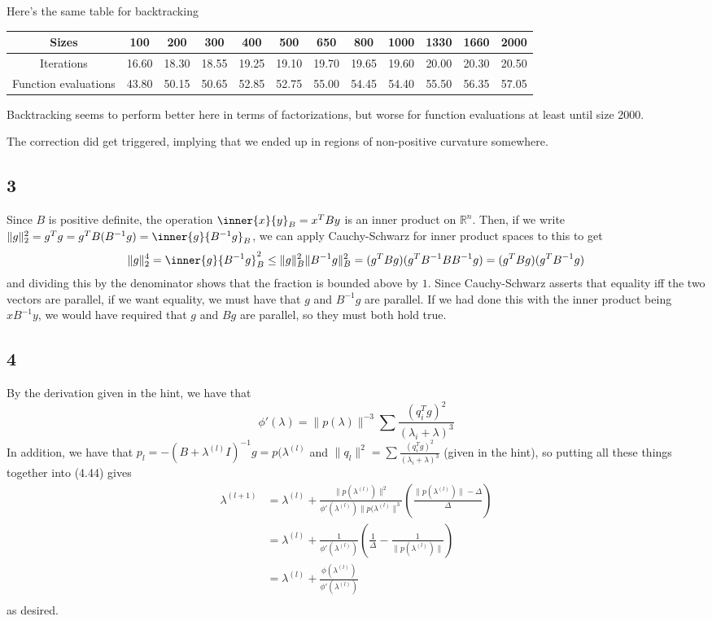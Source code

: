 \documentclass{article}
\newcommand{\rn}{\mathbb{R}}
\begin{document}
Here's the same table for backtracking

\begin{tabular}{c|ccccccccccc}
    Sizes&100&200&300&400&500&650&800&1000&1330&1660&2000\\
    \hline
    Iterations&16.60&18.30&18.55&19.25&19.10&19.70&19.65&19.60&20.00&20.30&20.50\\
    Function evaluations&43.80&50.15&50.65&52.85&52.75&55.00&54.45&54.40&55.50&56.35&57.05\\
\end{tabular}

Backtracking seems to perform better here in terms of factorizations, but worse for function evaluations at least until size 2000. 

The correction did get triggered, implying that we ended up in regions of non-positive curvature somewhere. 
\subsection*{3}
Since $B$ is positive definite, the operation $\inner{x}{y}_B=x^TBy$ is an inner product on $\rn^n$. Then, if we write $\|g\|^2_2=g^Tg=g^TB(B^{-1}g)=\inner{g}{B^{-1}g}_B$, we can apply Cauchy-Schwarz for inner product spaces to this to get 
\[\|g\|_2^4=\inner{g}{B^{-1}g}_B^2\leq\|g\|_B^2\|B^{-1}g\|_B^2=(g^TBg)(g^TB^{-1}BB^{-1}g)=(g^TBg)(g^TB^{-1}g)\]
and dividing this by the denominator shows that the fraction is bounded above by $1$. Since Cauchy-Schwarz asserts that equality iff the two vectors are parallel, if we want equality, we must have that $g$ and $B^{-1}g$ are parallel. If we had done this with the inner product being $xB^{-1}y$, we would have required that $g$ and $Bg$ are parallel, so they must both hold true.
\subsection*{4}
By the derivation given in the hint, we have that 
\[\phi'(\lambda)=\|p(\lambda)\|^{-3}\sum\frac{(q_i^Tg)^2}{(\lambda_i+\lambda)^3}\]
In addition, we have that $p_l=-(B+\lambda^{(l)}I)^{-1}g=p(\lambda^{(l)}$ and $\|q_l\|^2=\sum\frac{(q_i^Tg)^2}{(\lambda_i+\lambda)^3}$ (given in the hint), so putting all these things together into (4.44) gives
\begin{align*}
    \lambda^{(l+1)}&=\lambda^{(l)}+\frac{\|p(\lambda^{(l)})\|^2}{\phi'(\lambda^{(l)})\|p(\lambda^{(l)}\|^3}\left(\frac{\|p(\lambda^{(l)})\|-\Delta}{\Delta}\right)\\
                   &=\lambda^{(l)}+\frac{1}{\phi'(\lambda^{(l)})}\left(\frac{1}{\Delta}-\frac{1}{\|p(\lambda^{(l)})\|}\right)\\
                   &=\lambda^{(l)}+\frac{\phi(\lambda^{(l)})}{\phi'(\lambda^{(l)})}\\
\end{align*}
as desired.
\end{document}
